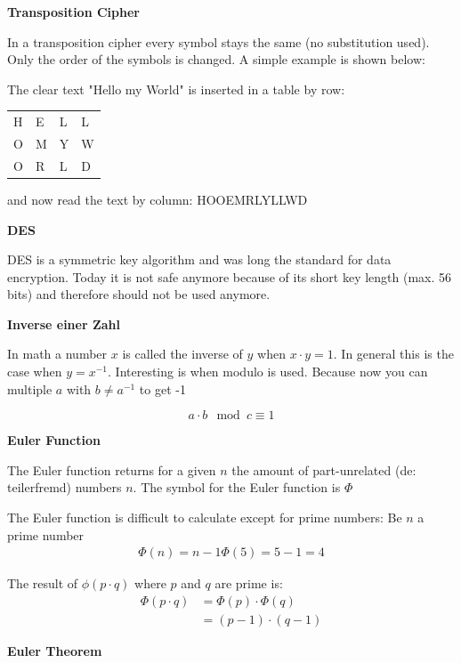 \documentclass[11pt,twoside,twocolumn,landscape]{article}
\begin{document}
\textbf{Transposition Cipher}

In a transposition cipher every symbol stays the same (no substitution used).
Only the order of the symbols is changed.
A simple example is shown below:

The clear text "Hello my World" is inserted in a table by row:

\begin{center}
\begin{tabular}{llll}
H & E & L & L\\
O & M & Y & W\\
O & R & L & D\\
\end{tabular}
\end{center}

and now read the text by column: HOOEMRLYLLWD

\textbf{DES}

DES is a symmetric key algorithm and was long the standard for data encryption.
Today it is not safe anymore because of its short key length (max. 56 bits) and therefore should not be used anymore.

\textbf{Inverse einer Zahl}

In math a number \(x\) is called the inverse of \(y\) when \(x \cdot y = 1\).
In general this is the case when \(y = x^{-1}\).
Interesting is when modulo is used.
Because now you can multiple \(a\) with \(b \ne a^{-1}\) to get -1

\begin{equation}
a \cdot b \mod c \equiv 1
\end{equation}

\textbf{Euler Function}

The Euler function returns for a given \(n\) the amount of part-unrelated (de: teilerfremd) numbers \(n\).
The symbol for the Euler function is \(\Phi\)

The Euler function is difficult to calculate except for prime numbers:
Be \(n\) a prime number
\begin{align}
\Phi(n) = n - 1
\Phi(5) = 5 - 1 = 4
\end{align}

The result of \(\phi(p \cdot q)\) where \(p\) and \(q\) are prime is:
\begin{align}
\Phi(p \cdot q) &= \Phi(p) \cdot \Phi(q) \\
&= (p - 1) \cdot (q - 1)
\end{align}

\textbf{Euler Theorem}
\end{document}
